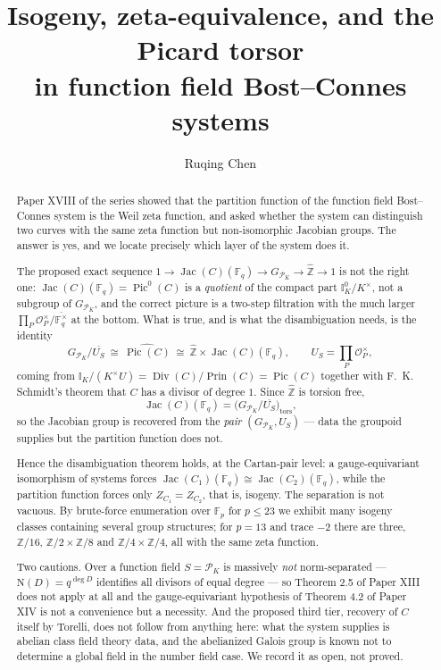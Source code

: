 \documentclass[11pt]{amsart}
\title[Isogeny and the Picard torsor]{Isogeny, zeta-equivalence, and the Picard torsor\\ in function field Bost--Connes systems}
\author{Ruqing Chen}
\date{}
\numberwithin{equation}{section}
\theoremstyle{definition}
\theoremstyle{remark}
\newcommand{\Z}{\mathbb{Z}}
\newcommand{\F}{\mathbb{F}}
\newcommand{\hZ}{\widehat{\Z}}
\newcommand{\cO}{\mathcal{O}}
\newcommand{\cP}{\mathcal{P}}
\newcommand{\Idl}{\mathbb{I}}
\newcommand{\Ns}{\mathrm{N}}
\newcommand{\Pic}{\operatorname{Pic}}
\newcommand{\Jac}{\operatorname{Jac}}
\newcommand{\Div}{\operatorname{Div}}
\newcommand{\Prin}{\operatorname{Prin}}
\newcommand{\tors}{\mathrm{tors}}
\begin{document}
\begin{abstract}
Paper XVIII of the series showed that the partition function of the function field
Bost--Connes system is the Weil zeta function, and asked whether the system can distinguish
two curves with the same zeta function but non-isomorphic Jacobian groups. The answer is yes,
and we locate precisely which layer of the system does it.

The proposed exact sequence $1\to\Jac(C)(\F_q)\to G_{\cP_K}\to\hZ\to1$ is not the right one:
$\Jac(C)(\F_q)=\Pic^0(C)$ is a \emph{quotient} of the compact part
$\Idl^0_K/K^\times$, not a subgroup of $G_{\cP_K}$, and the correct picture is a two-step
filtration with the much larger $\prod_P\cO_P^\times/\overline{\F_q^\times}$ at the bottom.
What is true, and is what the disambiguation needs, is the identity
\[
G_{\cP_K}\big/\overline{U_S}\ \cong\ \widehat{\Pic(C)}\ \cong\ \hZ\times\Jac(C)(\F_q),
\qquad U_S=\prod_P\cO_P^\times,
\]
coming from $\Idl_K/(K^\times U)=\Div(C)/\Prin(C)=\Pic(C)$ together with F.~K. Schmidt's
theorem that $C$ has a divisor of degree $1$. Since $\hZ$ is torsion free,
\[
\Jac(C)(\F_q)=\bigl(G_{\cP_K}/\overline{U_S}\bigr)_{\tors},
\]
so the Jacobian group is recovered from the \emph{pair} $(G_{\cP_K},U_S)$ --- data the
groupoid supplies but the partition function does not.

Hence the disambiguation theorem holds, at the Cartan-pair level: a gauge-equivariant
isomorphism of systems forces $\Jac(C_1)(\F_q)\cong\Jac(C_2)(\F_q)$, while the partition
function forces only $Z_{C_1}=Z_{C_2}$, that is, isogeny. The separation is not vacuous. By
brute-force enumeration over $\F_p$ for $p\le23$ we exhibit many isogeny classes containing
several group structures; for $p=13$ and trace $-2$ there are three,
$\Z/16$, $\Z/2\times\Z/8$ and $\Z/4\times\Z/4$, all with the same zeta function.

Two cautions. Over a function field $S=\cP_K$ is massively \emph{not} norm-separated ---
$\Ns(D)=q^{\deg D}$ identifies all divisors of equal degree --- so Theorem 2.5 of Paper XIII
does not apply at all and the gauge-equivariant hypothesis of Theorem 4.2 of Paper XIV is
not a convenience but a necessity. And the proposed third tier, recovery of $C$ itself by
Torelli, does not follow from anything here: what the system supplies is abelian class field
theory data, and the abelianized Galois group is known not to determine a global field in the
number field case. We record it as open, not proved.
\end{abstract}
\end{document}
